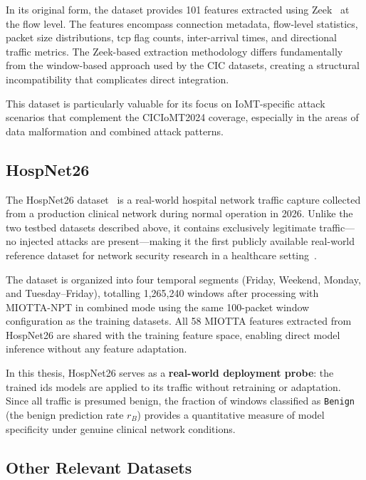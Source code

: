 In its original form, the dataset provides 101 features extracted using Zeek~\cite{zeek} at the flow level. The features encompass connection metadata, flow-level statistics, packet size distributions, \gls{tcp} flag counts, inter-arrival times, and directional traffic metrics. The Zeek-based extraction methodology differs fundamentally from the window-based approach used by the CIC datasets, creating a structural incompatibility that complicates direct integration.

This dataset is particularly valuable for its focus on IoMT-specific attack scenarios that complement the CICIoMT2024 coverage, especially in the areas of data malformation and combined attack patterns.

\subsection{HospNet26}
\label{subsec:hospnet26}

The HospNet26 dataset~\cite{hospnet26} is a real-world hospital network traffic capture collected from a production clinical network during normal operation in 2026. Unlike the two testbed datasets described above, it contains exclusively legitimate traffic---no injected attacks are present---making it the first publicly available real-world reference dataset for network security research in a healthcare setting~\cite{domenech2026robust}.

The dataset is organized into four temporal segments (Friday, Weekend, Monday, and Tuesday--Friday), totalling 1,265,240 windows after processing with MIOTTA-NPT in combined mode using the same 100-packet window configuration as the training datasets. All 58 MIOTTA features extracted from HospNet26 are shared with the training feature space, enabling direct model inference without any feature adaptation.

In this thesis, HospNet26 serves as a \textbf{real-world deployment probe}: the trained \gls{ids} models are applied to its traffic without retraining or adaptation. Since all traffic is presumed benign, the fraction of windows classified as \texttt{Benign} (the benign prediction rate $r_B$) provides a quantitative measure of model specificity under genuine clinical network conditions.

\subsection{Other Relevant Datasets}
\label{subsec:other-datasets}

